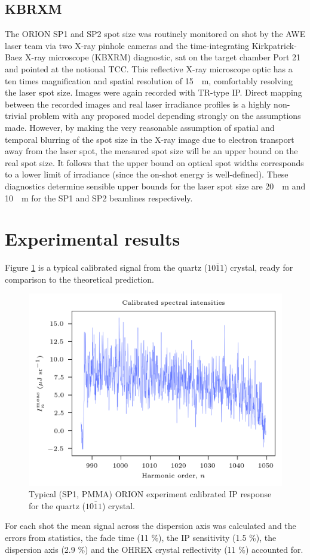 \subsection{KBRXM}
The ORION SP1 and SP2 spot size was routinely monitored on shot by the AWE laser team via two X-ray pinhole cameras and the time-integrating Kirkpatrick-Baez X-ray microscope (KBXRM) diagnostic, sat on the target chamber Port 21 and pointed at the notional \ac{TCC}. This reflective X-ray microscope optic has a ten times magnification and spatial resolution of \qty{15}{\mu m}, comfortably resolving the laser spot size. Images were again recorded with TR-type IP. Direct mapping between the recorded images and real laser irradiance profiles is a highly non-trivial problem with any proposed model depending strongly on the assumptions made. However, by making the very reasonable assumption of spatial and temporal blurring of the spot size in the X-ray image due to electron transport away from the laser spot, the measured spot size will be an upper bound on the real spot size. It follows that the upper bound on optical spot widths corresponds to a lower limit of irradiance (since the on-shot energy is well-defined). These diagnostics determine sensible upper bounds for the laser spot size are \qty{20}{\mu m} and \qty{10}{\mu m} for the SP1 and SP2 beamlines respectively.

\section{\label{ch:3-sec:results}Experimental results}
Figure \ref{fig:orionq1011} is a typical calibrated signal from the quartz ($10\bar{1}1$) crystal, ready for comparison to the theoretical prediction.
\begin{figure}
	\centering
	\includegraphics[width=0.7\linewidth]{figures/orion/orion_q1011}
	\caption[Typical ORION experiment calibrated IP response for the quartz ($10\bar{1}1$) crystal.]{Typical (SP1, PMMA) ORION experiment calibrated IP response for the quartz ($10\bar{1}1$) crystal.}
	\label{fig:orionq1011}
\end{figure}
For each shot the mean signal across the dispersion axis was calculated and the errors from statistics, the fade time (11 \%), the IP sensitivity (1.5 \%), the dispersion axis (2.9 \%) and the OHREX crystal reflectivity (11 \%) accounted for.


